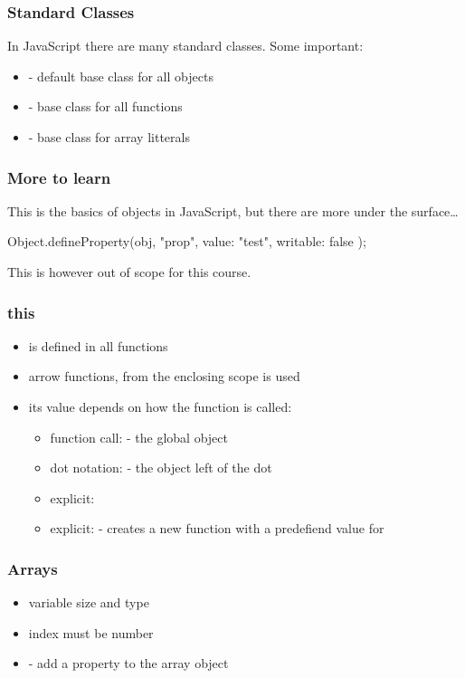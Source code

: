 \begin{frame}[fragile] \frametitle{Standard Classes}
In JavaScript there are many standard classes. Some important: 
\begin{itemize}
  \item {} - default base class for all objects
  \item {} - base class for all functions
  \item {} - base class for array litterals
\end{itemize}
\end{frame}

\begin{frame}[fragile] \frametitle{More to learn}

This is the basics of objects in JavaScript, but there are more under the surface\ldots
\vspace{8mm}
\begin{CodeBox}{}
Object.defineProperty(obj, "prop", {
    value: "test",
    writable: false
});
\end{CodeBox}
\vspace{8mm}
This is however out of scope for this course.
\end{frame}

\begin{frame}[fragile] \frametitle{this}
\begin{itemize}
  \item {} is defined in all functions
  \item arrow functions,  from the enclosing scope is used
  \item its value depends on how the function is called:
  \begin{itemize}
    \item function call:  - the global object
    \item dot notation:  - the object left of the dot
    \item explicit: 
    \item explicit:  - creates a new function with a predefiend value for 
  \end{itemize}
\end{itemize}
\end{frame}

\begin{frame}[fragile] \frametitle{Arrays}
\begin{itemize}
  \item variable size and type
  \item index must be number
  \item {} - add a property to the array object
\end{itemize}
\end{frame}